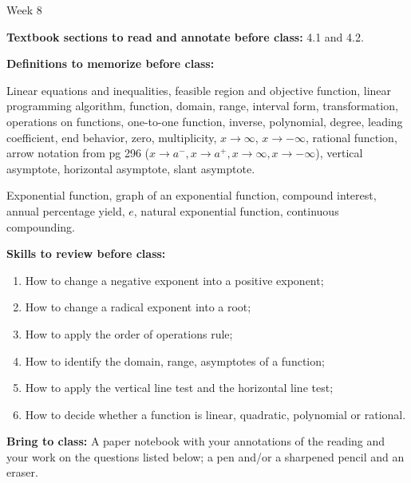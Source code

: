 \documentclass[12pt,dvipsnames]{article}
\begin{document}
\thispagestyle{empty}

	\begin{center}
		{\large{Week 8}}
	\end{center}

{\bfseries{Textbook sections to read and annotate before class:}} 4.1 and 4.2.

\smallskip

	{\bfseries{Definitions to memorize before class:}} 

\begin{description}[topsep=0pt,itemsep=-2ex,partopsep=0ex,parsep=1ex]
\item[From Weeks 1-6] Linear equations and inequalities, feasible region and objective function, linear programming algorithm,  function, domain, range, interval form, transformation, operations on functions, one-to-one function, inverse, polynomial, degree, leading coefficient, end behavior, zero, multiplicity, $x\to \infty$, $x\to -\infty$, rational function, arrow notation from pg 296 ($x\to a^{-}, x\to a^{+}, x\to \infty, x\to -\infty$), vertical asymptote, horizontal asymptote, slant asymptote. 
\item[From Sections 4.1, 4.2] Exponential function, graph of an exponential function, compound interest, annual percentage yield, $e$, natural exponential function, continuous compounding.
\end{description}
\smallskip	
	
	{\bfseries{Skills to review before class:} }
\begin{multicols}{2}
	\begin{enumerate}[topsep=0pt,itemsep=-2ex,partopsep=0ex,parsep=1ex]
		
\item How to change a negative exponent into a positive exponent;
\item How to change a radical exponent into a root;
\item How to apply the order of operations rule;
\item How to identify the domain, range, asymptotes of a function;
\item How to apply the vertical line test and the horizontal line test;
\item How to decide whether a function is linear, quadratic, polynomial or rational.
		
	\end{enumerate}
		
\end{multicols}
{\bfseries{Bring to class:} } A paper notebook with your annotations of the reading and your work on the questions listed below; a pen and/or a sharpened pencil and an eraser.
\end{document}
